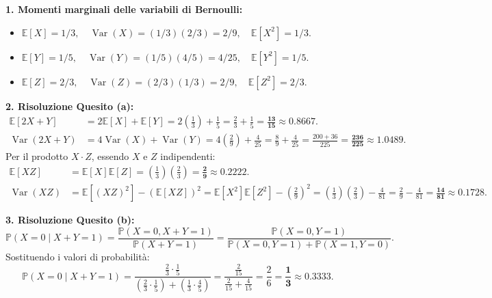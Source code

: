 \documentclass[11pt,a4paper]{article}
\newcommand{\EE}{\mathbb{E}}
\newcommand{\Prob}{\mathbb{P}}
\newcommand{\Var}{\operatorname{Var}}
\begin{document}
\begin{soluzionebox}
\textbf{1. Momenti marginali delle variabili di Bernoulli:}
\begin{itemize}
    \item $\EE[X] = 1/3, \quad \Var(X) = (1/3)(2/3) = 2/9, \quad \EE[X^2] = 1/3$.
    \item $\EE[Y] = 1/5, \quad \Var(Y) = (1/5)(4/5) = 4/25, \quad \EE[Y^2] = 1/5$.
    \item $\EE[Z] = 2/3, \quad \Var(Z) = (2/3)(1/3) = 2/9, \quad \EE[Z^2] = 2/3$.
\end{itemize}

\textbf{2. Risoluzione Quesito (a):}
\begin{align*}
\EE[2X+Y] &= 2\EE[X] + \EE[Y] = 2\left(\frac{1}{3}\right) + \frac{1}{5} = \frac{2}{3} + \frac{1}{5} = \mathbf{\frac{13}{15} \approx 0.8667}. \\
\Var(2X+Y) &= 4\Var(X) + \Var(Y) = 4\left(\frac{2}{9}\right) + \frac{4}{25} = \frac{8}{9} + \frac{4}{25} = \frac{200 + 36}{225} = \mathbf{\frac{236}{225} \approx 1.0489}.
\end{align*}
Per il prodotto $X \cdot Z$, essendo $X$ e $Z$ indipendenti:
\begin{align*}
\EE[XZ] &= \EE[X]\EE[Z] = \left(\frac{1}{3}\right)\left(\frac{2}{3}\right) = \mathbf{\frac{2}{9} \approx 0.2222}. \\
\Var(XZ) &= \EE[(XZ)^2] - (\EE[XZ])^2 = \EE[X^2]\EE[Z^2] - \left(\frac{2}{9}\right)^2 = \left(\frac{1}{3}\right)\left(\frac{2}{3}\right) - \frac{4}{81} = \frac{2}{9} - \frac{4}{81} = \mathbf{\frac{14}{81} \approx 0.1728}.
\end{align*}

\textbf{3. Risoluzione Quesito (b):}
\[
\Prob(X=0 \mid X+Y=1) = \frac{\Prob(X=0, X+Y=1)}{\Prob(X+Y=1)} = \frac{\Prob(X=0, Y=1)}{\Prob(X=0, Y=1) + \Prob(X=1, Y=0)}.
\]
Sostituendo i valori di probabilità:
\[
\Prob(X=0 \mid X+Y=1) = \frac{\frac{2}{3} \cdot \frac{1}{5}}{\left(\frac{2}{3} \cdot \frac{1}{5}\right) + \left(\frac{1}{3} \cdot \frac{4}{5}\right)} = \frac{\frac{2}{15}}{\frac{2}{15} + \frac{4}{15}} = \frac{2}{6} = \mathbf{\frac{1}{3} \approx 0.3333}.
\]


\end{soluzionebox}
\end{document}
